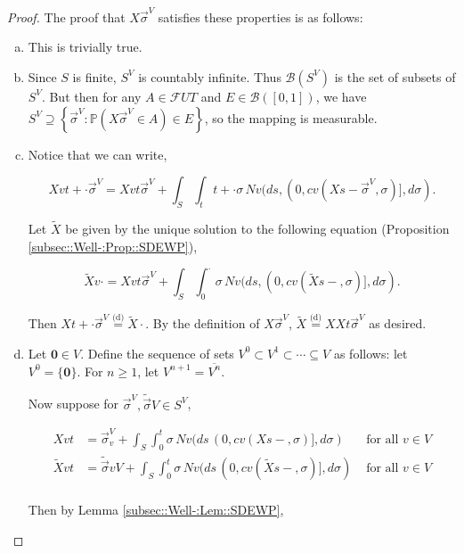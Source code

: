 \documentclass[12pt]{article}
\newcommand{\mb}{\mathbb}
\newcommand{\mc}{\mathcal}
\newcommand{\ms}{\mathscr}
\newcommand{\ov}{\overline}
\newcommand{\te}{\text}
\newcommand{\ind}{\hspace{24pt}}
\newcommand{\pr}{\mb{P}}							%
\newcommand{\deq}{\overset{\text{(d)}}{=}}			%
\renewcommand{\root}{\mathbf{0}}				%
\renewcommand{\v}{v}							%
\renewcommand{\U}{U}							%
\renewcommand{\S}{S}							%
\newcommand{\s}{\sigma}							%
\newcommand{\sv}{\vec{\s}}						%
\newcommand{\T}{T}								%
\renewcommand{\t}{t}							%
\renewcommand{\tt}{s}							%
\newcommand{\F}{\mc{F}}							%
\newcommand{\X}{X}								%
\newcommand{\IGr}{c}							%
\newcommand{\carp}[1]{^{#1}}					%
\newcommand{\vsi}[1]{^{#1}}						%
\newcommand{\cind}[1]{_{#1}}					%
\newcommand{\cl}{\ov}							%
\newcommand{\sln}[1]{^{#1}}						%
\newcommand{\poiss}{N}							%
\newcommand{\alt}[1]{\widetilde{#1}}			%
\begin{document}
\begin{proof}
The proof that \(\X{}{}{\sv\cind{}\vsi{V}}\) satisfies these properties is as follows:

\begin{enumerate}[(a)]
\item This is trivially true.

\item Since \(\S\) is finite, \(\S\carp{V}\) is countably infinite. Thus \(\ms{B}(\S\carp{V})\) is the set of subsets of \(\S\carp{V}\). But then for any \(A \in \F{\U}{\T}\) and \(E \in \ms{B}([0,1])\), we have \(\S\carp{V} \supseteq \left\{\sv\cind{}\vsi{V}: \pr\left(\X{}{}{\sv\cind{}\vsi{V}} \in A\right) \in E\right\}\), so the mapping is measurable.

\item Notice that we can write,

\[\X{\v}{\t+\cdot}{\sv\cind{}\vsi{V}} = \X{\v}{\t}{\sv\cind{}\vsi{V}} + \int_\S\int_\t{\t+\cdot} \s\,\poiss{\v}(d\tt,(0,\IGr{\v}(\X{}{\tt-}{\sv\cind{}\vsi{V}},\s)],d\s).\]

Let \(\alt{\X}{}{}\) be given by the unique solution to the following equation (Proposition \ref{subsec::Well-:Prop::SDEWP}),

\[\alt{\X}{\v}{\cdot} = \X{\v}{\t}{\sv\cind{}\vsi{V}} + \int_\S \int_0^\cdot \s\,\poiss{\v}(d\tt,(0,\IGr{\v}(\alt{\X}{}{\tt-},\s)],d\s).\]

Then \(\X{}{\t+\cdot}{\sv\cind{}\vsi{V}} \deq \alt{\X}{}{\cdot}\). By the definition of \(\X{}{}{\sv\cind{}\vsi{V}}\), \(\alt{\X}{}{} \deq \X{}{}{\X{}{\t}{\sv\cind{}\vsi{V}}}\) as desired.

\item Let \(\root \in V\). Define the sequence of sets \(V\sln{0}\subset V\sln{1}\subset \cdots \subseteq V\) as follows: let \(V\sln{0} = \{\root\}\). For \(n \geq 1\), let \(V\sln{n+1} = \cl{V\sln{n}}\).

\ind Now suppose for \(\sv\cind{}\vsi{V},\alt{\sv}{}{V}\in \S\carp{V}\),

\begin{align*}
\X{\v}{\t} &= \sv\cind{\v}\vsi{V} + \int_\S\int_0^\t \s\,\poiss{\v}(d\tt\,(0,\IGr{\v}(\X{}{\tt-},\s)],d\s)&\te{ for all } \v \in V\\
\alt{\X}{\v}{\t} &= \alt{\sv}{\v}{V} + \int_\S\int_0^\t \s\,\poiss{\v}(d\tt\,(0,\IGr{\v}(\alt{\X}{}{\tt-},\s)],d\s)&\te{ for all } \v \in V\\
\end{align*}

Then by Lemma \ref{subsec::Well-:Lem::SDEWP},


\end{enumerate}
\end{proof}
\end{document}
